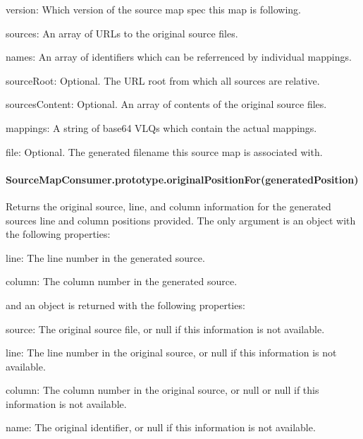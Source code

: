 \begin{DoxyItemize}
\item {\ttfamily version}\+: Which version of the source map spec this map is following.
\item {\ttfamily sources}\+: An array of U\+R\+Ls to the original source files.
\item {\ttfamily names}\+: An array of identifiers which can be referrenced by individual mappings.
\item {\ttfamily source\+Root}\+: Optional. The U\+R\+L root from which all sources are relative.
\item {\ttfamily sources\+Content}\+: Optional. An array of contents of the original source files.
\item {\ttfamily mappings}\+: A string of base64 V\+L\+Qs which contain the actual mappings.
\item {\ttfamily file}\+: Optional. The generated filename this source map is associated with.
\end{DoxyItemize}

\paragraph*{Source\+Map\+Consumer.\+prototype.\+original\+Position\+For(generated\+Position)}

Returns the original source, line, and column information for the generated source\textquotesingle{}s line and column positions provided. The only argument is an object with the following properties\+:


\begin{DoxyItemize}
\item {\ttfamily line}\+: The line number in the generated source.
\item {\ttfamily column}\+: The column number in the generated source.
\end{DoxyItemize}

and an object is returned with the following properties\+:


\begin{DoxyItemize}
\item {\ttfamily source}\+: The original source file, or null if this information is not available.
\item {\ttfamily line}\+: The line number in the original source, or null if this information is not available.
\item {\ttfamily column}\+: The column number in the original source, or null or null if this information is not available.
\item {\ttfamily name}\+: The original identifier, or null if this information is not available.
\end{DoxyItemize}

